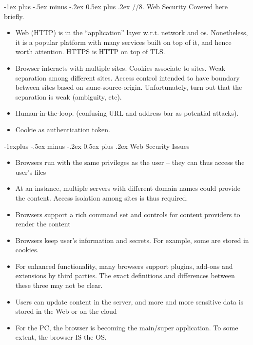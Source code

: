 \documentclass[10pt, landscape]{article}
\makeatletter
\renewcommand{\section}{\@startsection{section}{1}{0mm}%
                                {-1ex plus -.5ex minus -.2ex}%
                                {0.5ex plus .2ex}%
                                {\normalfont\large\bfseries}}
\renewcommand{\subsection}{\@startsection{subsection}{2}{0mm}%
                                {-1explus -.5ex minus -.2ex}%
                                {0.5ex plus .2ex}%
                                {\normalfont\normalsize\bfseries}}
\makeatother
\begin{document}
\begin{multicols*}{3}
\section{//8. Web Security}
Covered here briefly.
\begin{itemize}
\item Web (HTTP) is in the “application” layer w.r.t. network and os. Nonetheless, it is a popular platform with many services built on top of it, and hence worth attention. HTTPS is HTTP on top of TLS.
\item Browser interacts with multiple sites. Cookies associate to sites. Weak separation among different sites. Access control intended to have boundary between sites based on same-source-origin. Unfortunately, turn out that the separation is weak (ambiguity, etc).
\item Human-in-the-loop. (confusing URL and address bar as potential attacks).
\item Cookie as authentication token.
\end{itemize}

\subsection{Web Security Issues}
\begin{itemize}
\item Browsers run with the same privileges as the user – they can thus access the user’s files
\item At an instance, multiple servers with different domain names could provide the 
content. Access isolation among sites is thus required.
\item Browsers support a rich command set and controls for content providers to render 
the content
\item Browsers keep user’s information and secrets. For example, some are stored in 
cookies.
\item For enhanced functionality, many browsers support plugins, add-ons and extensions by third parties. The exact definitions and differences between these three may not be clear.
\item Users can update content in the server, and more and more sensitive data is stored 
in the Web or on the cloud
\item For the PC, the browser is becoming the main/super application. To some extent, the browser IS the OS.
\end{itemize}


\end{multicols*}
\end{document}
